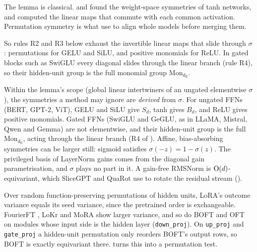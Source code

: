 The lemma is classical. \citet{xsussmann1992uniqueness} and \citet{xchen1993geometry} found the weight-space symmetries of
tanh networks, and \citet{xgodfrey2022symmetries} computed the linear maps that commute with each common activation.
Permutation symmetry is what \citet{ainsworth2022git} use to align whole models before merging them.

So rules R2 and R3 below exhaust the invertible linear maps that slide through $\sigma$: permutations for GELU and SiLU,
and positive monomials for ReLU. In gated blocks such as SwiGLU every diagonal slides through the linear branch (rule
R4), so their hidden-unit group is the full monomial group $\mathrm{Mon}_{d_{\mathrm{ff}}}$.

\begin{explains}
Within the lemma's scope (global linear intertwiners of an ungated elementwise $\sigma$), the symmetries a method may
ignore are \emph{derived} from $\sigma$. For ungated FFNs (BERT, GPT-2, ViT), GELU and SiLU give $S_d$, tanh gives $B_d$,
and ReLU gives positive monomials. Gated FFNs (SwiGLU and GeGLU, as in LLaMA, Mistral, Qwen and Gemma) are not
elementwise, and their hidden-unit group is the full $\mathrm{Mon}_{d_{\mathrm{ff}}}$, acting through the linear branch
(R4 of ). Affine, bias-absorbing symmetries can be larger still: sigmoid satisfies
$\sigma(-z)=1-\sigma(z)$. The privileged basis of LayerNorm gains comes from the diagonal gain parametrisation, and
$\sigma$ plays no part in it. A gain-free RMSNorm is $\mathrm{O}(d)$-equivariant, which SliceGPT \citep{xashkboos2024slicegpt} and QuaRot
\citep{xashkboos2024quarot} use to rotate the residual stream ().
\end{explains}

\noindent{}\enspace Over random function-preserving permutations of hidden units, LoRA's outcome
variance equals its seed variance, since the pretrained order is exchangeable. FourierFT \citep{gao2024parameter}, LoKr
\citep{yeh2023navigating} and MoRA \citep{jiang2024mora} show larger variance, and so do BOFT \citep{liu2023parameter}
and OFT \citep{qiu2023controlling} on modules whose input side is the hidden layer (\texttt{down\_proj}). On
\texttt{up\_proj} and \texttt{gate\_proj} a hidden-unit permutation only reorders BOFT's output rows, so BOFT is exactly
equivariant there.  turns this into a permutation test.

